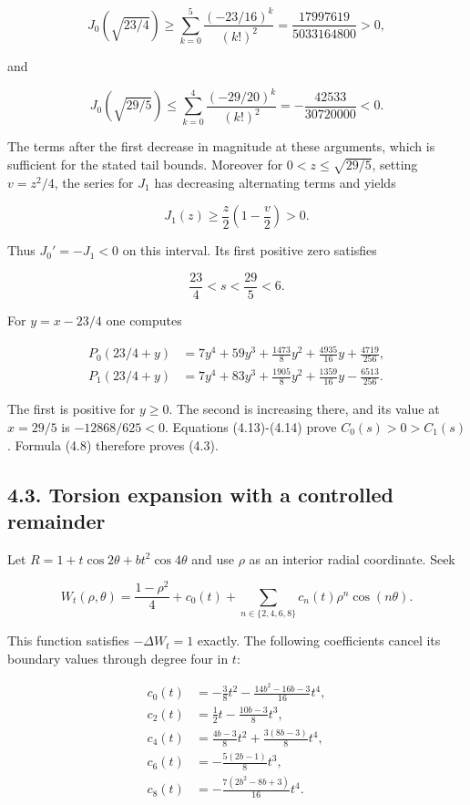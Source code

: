 \documentclass[11pt]{article}
\begin{document}
\[
J_0(\sqrt{23/4})\ge\sum_{k=0}^{5}\frac{(-23/16)^k}{(k!)^2}
=\frac{17997619}{5033164800}>0,
\tag{4.10}
\]

and

\[
J_0(\sqrt{29/5})\le\sum_{k=0}^{4}\frac{(-29/20)^k}{(k!)^2}
=-\frac{42533}{30720000}<0.
\tag{4.11}
\]

The terms after the first decrease in magnitude at these arguments,
which is sufficient for the stated tail bounds. Moreover for
\(0<z\le\sqrt{29/5}\), setting \(v=z^2/4\), the series for \(J_1\) has
decreasing alternating terms and yields

\[
J_1(z)\ge\frac z2\left(1-\frac v2\right)>0.
\tag{4.12}
\]

Thus \(J_0'=-J_1<0\) on this interval. Its first positive zero satisfies

\[
\frac{23}{4}<s<\frac{29}{5}<6.
\tag{4.13}
\]

For \(y=x-23/4\) one computes

\[
\begin{aligned}
P_0(23/4+y)&=7y^4+59y^3+\frac{1473}{8}y^2+\frac{4935}{16}y+\frac{4719}{256},\\
P_1(23/4+y)&=7y^4+83y^3+\frac{1905}{8}y^2+\frac{1359}{16}y-\frac{6513}{256}.
\end{aligned}
\tag{4.14}
\]

The first is positive for \(y\ge0\). The second is increasing there, and
its value at \(x=29/5\) is \(-12868/625<0\). Equations (4.13)-(4.14)
prove \(C_0(s)>0>C_1(s)\). Formula (4.8) therefore proves (4.3).

\subsection{4.3. Torsion expansion with a controlled
remainder}\label{torsion-expansion-with-a-controlled-remainder}

Let \(R=1+t\cos2\theta+bt^2\cos4\theta\) and use \(\rho\) as an interior
radial coordinate. Seek

\[
W_t(\rho,\theta)=\frac{1-\rho^2}{4}
+c_0(t)+\sum_{n\in\{2,4,6,8\}}c_n(t)\rho^n\cos(n\theta).
\tag{4.15}
\]

This function satisfies \(-\Delta W_t=1\) exactly. The following
coefficients cancel its boundary values through degree four in \(t\):

\[
\begin{aligned}
c_0(t)&=-\frac38t^2-\frac{14b^2-16b-3}{16}t^4,\\
c_2(t)&=\frac12t-\frac{10b-3}{8}t^3,\\
c_4(t)&=\frac{4b-3}{8}t^2+\frac{3(8b-3)}8t^4,\\
c_6(t)&=-\frac{5(2b-1)}8t^3,\\
c_8(t)&=-\frac{7(2b^2-8b+3)}{16}t^4.
\end{aligned}
\tag{4.16}
\]
\end{document}

